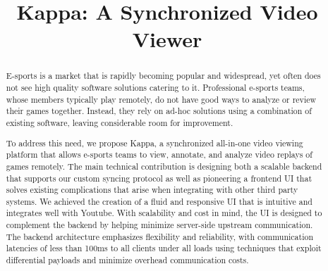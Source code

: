 \documentclass[conference]{IEEEtran}
\begin{document}
\title{Kappa: A Synchronized Video Viewer}

\author{
\and
{}
\and
{}
}



\maketitle

\begin{abstract}
  E-sports is a market that is rapidly becoming popular and widespread, yet often does not see high quality software solutions catering to it. Professional e-sports teams, whose members typically play remotely, do not have good ways to analyze or review their games together. Instead, they rely on ad-hoc solutions using a combination of existing software, leaving considerable room for improvement. 

  To address this need, we propose Kappa, a synchronized all-in-one video viewing platform that allows e-sports teams to view, annotate, and analyze video replays of games remotely. The main technical contribution is designing both a scalable backend that supports our custom syncing protocol as well as pioneering a frontend UI that solves existing complications that arise when integrating with other third party systems. We achieved the creation of a fluid and responsive UI that is intuitive and integrates well with Youtube. With scalability and cost in mind, the UI is designed to complement the backend by helping minimize server-side upstream communication. The backend architecture emphasizes flexibility and reliability, with communication latencies of less than 100ms to all clients under all loads using techniques that exploit differential payloads and minimize overhead communication costs. 
\end{abstract}

\IEEEpeerreviewmaketitle
\end{document}

